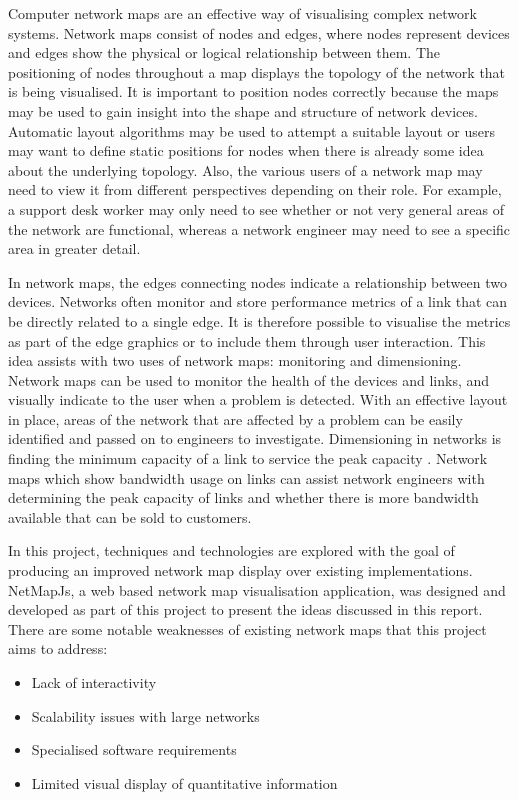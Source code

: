 \documentclass[11pt, a4paper]{article}
\begin{document}
Computer network maps are an effective way of visualising complex network
systems. Network maps consist of nodes and edges, where nodes represent devices
and edges show the physical or logical relationship between them. The
positioning of nodes throughout a map displays the topology of the network that
is being visualised. It is important to position nodes correctly because the
maps may be used to gain insight into the shape and structure of network
devices.  Automatic layout algorithms may be used to attempt a suitable layout or
users may want to define static positions for nodes when there is already some
idea about the underlying topology. Also, the various users of a network map may
need to view it from different perspectives depending on their role. For
example, a support desk worker may only need to see whether or not very general
areas of the network are functional, whereas a network engineer may need to see
a specific area in greater detail.

In network maps, the edges connecting nodes indicate a relationship between two
devices. Networks often monitor and store performance metrics of a link that can
be directly related to a single edge. It is therefore possible to visualise the
metrics as part of the edge graphics or to include them through user
interaction. This idea assists with two uses of network maps: monitoring and
dimensioning. Network maps can be used to monitor the health of the devices and
links, and visually indicate to the user when a problem is detected. With an
effective layout in place, areas of the network that are affected by a problem
can be easily identified and passed on to engineers to investigate. Dimensioning
in networks is finding the minimum capacity of a link to service the peak
capacity \cite{Girard_1990}. Network maps which show bandwidth usage on links
can assist network engineers with determining the peak capacity of links and
whether there is more bandwidth available that can be sold to customers.

In this project, techniques and technologies are explored with the goal of
producing an improved network map display over existing implementations.
NetMapJs, a web based network map visualisation application, was designed and
developed as part of this project to present the ideas discussed in this report.
There are some notable weaknesses of existing network maps that this project
aims to address:

\begin{itemize}
  \item Lack of interactivity
  \item Scalability issues with large networks
  \item Specialised software requirements
  \item Limited visual display of quantitative information
\end{itemize}
\end{document}
